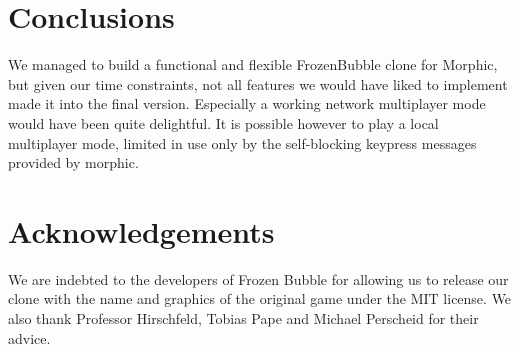 \section{Conclusions}
We managed to build a functional and flexible FrozenBubble clone for Morphic,
but given our time constraints, not all features we would have liked to implement
made it into the final version. Especially a working network multiplayer mode would
have been quite delightful. It is possible however to play a local multiplayer mode,
limited in use only by the self-blocking keypress messages provided by morphic.

\section*{Acknowledgements}
We are indebted to the developers of Frozen Bubble for allowing us to release 
our clone with the name and graphics of the original game under the MIT 
license. We also thank Professor Hirschfeld, Tobias Pape and Michael Perscheid for 
their advice.
